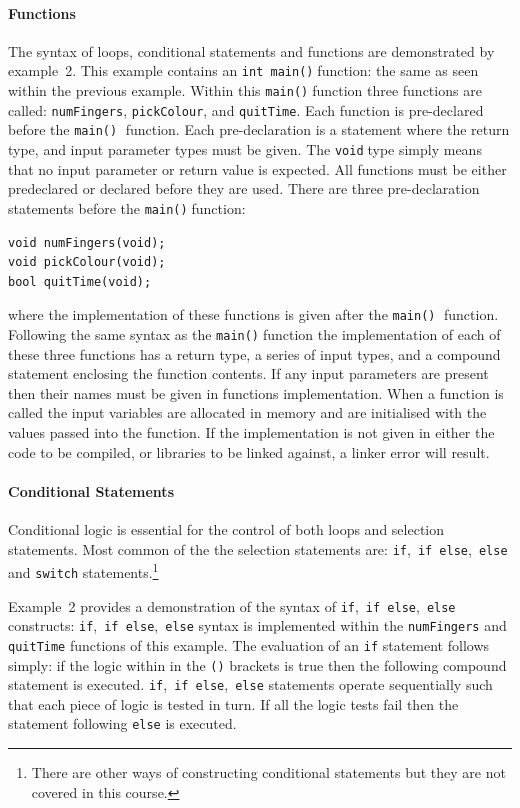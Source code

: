 \documentclass[11pt,a4paper]{scrartcl}
\def\main{\texttt{main()}$\;$}
\def\intmain{\texttt{int main()}$\;$}
\def\void{\texttt{void}$\;$}
\begin{document}
\paragraph{Functions}
The syntax of loops, conditional statements and functions are
demonstrated by example~2.  This example contains an \intmain function: the same as seen within the previous example.  Within this \main function three functions are called:
\texttt{numFingers}, \texttt{pickColour}, and
\texttt{quitTime}.  Each function is pre-declared before the \main
function.  Each pre-declaration is a statement where the return type,
and input parameter types must be given.  The \void type simply means that
no input parameter or return value is expected.  All functions must be
either predeclared or declared before they are used.  There are three
pre-declaration statements before the \main function:
\begin{verbatim}
void numFingers(void);
void pickColour(void);
bool quitTime(void);
\end{verbatim}
where the implementation of these functions is given after the \main
function.  Following the same syntax as the \main function the
implementation of each of these three functions has a return type, a
series of input types, and a compound statement enclosing the function
contents.  If any input parameters are present then their names must
be given in functions implementation.  When a function is called the
input variables are allocated in memory and are initialised with the
values passed into the function.  If the implementation is not given in
either the code to be compiled, or libraries to be linked against, a linker
error will result.

\paragraph{Conditional Statements}
Conditional logic is essential for the control of both loops and
selection statements.  Most common of the the selection statements
are: \texttt{if},~\texttt{if~else},~\texttt{else} and \texttt{switch}
statements.\footnote{There are other ways of constructing conditional
statements but they are not covered in this course.}

Example~2 provides a demonstration of the syntax of
\texttt{if},~\texttt{if~else},~\texttt{else} constructs:
\texttt{if},~\texttt{if~else},~\texttt{else} syntax is implemented
within the \texttt{numFingers} and \texttt{quitTime} functions of this
example.  The evaluation of an \texttt{if} statement follows simply:
if the logic within in the \texttt{()} brackets is true then the
following compound statement is executed.
\texttt{if},~\texttt{if~else},~\texttt{else} statements operate
sequentially such that each piece of logic is tested in turn.  If all
the logic tests fail then the statement following \texttt{else} is
executed.
\end{document}
